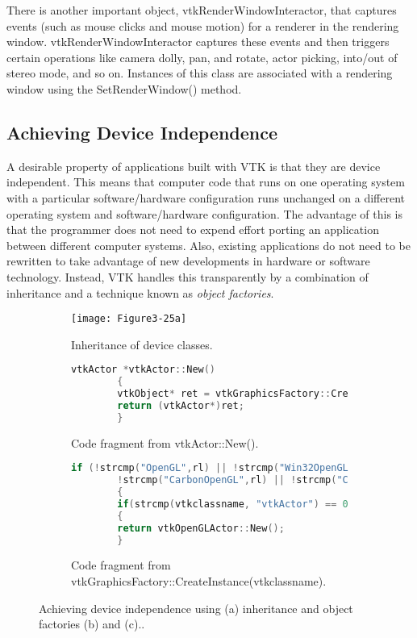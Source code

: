 There is another important object, vtkRenderWindowInteractor, that captures events (such as mouse clicks and mouse motion) for a renderer in the rendering window. vtkRenderWindowInteractor captures these events and then triggers certain operations like camera dolly, pan, and rotate, actor picking, into/out of stereo mode, and so on. Instances of this class are associated with a rendering window using the SetRenderWindow() method.

\subsection{Achieving Device Independence}
\label{sec:adi}
A desirable property of applications built with VTK is that they are device independent. This means that computer code that runs on one operating system with a particular software/hardware configuration runs unchanged on a different operating system and software/hardware configuration. The advantage of this is that the programmer does not need to expend effort porting an application between different computer systems. Also, existing applications do not need to be rewritten to take advantage of new developments in hardware or software technology. Instead, VTK handles this transparently by a combination of inheritance and a technique known as \emph{object factories}.

\begin{figure}[!htb]
	\begin{subfigure}[h]{0.96\linewidth}
		\texttt{[image: Figure3-25a]}
		\caption{Inheritance of device classes.}
		\label{fig:Figure3-25a}
	\end{subfigure}
	\hfill
	\begin{subfigure}[h]{0.96\linewidth}
		\caption*{}
	\end{subfigure}
	\hfill
	\begin{subfigure}[h]{0.96\linewidth}
		\begin{lstlisting}[language=C++, caption={}]
		vtkActor *vtkActor::New()
		{
		vtkObject* ret = vtkGraphicsFactory::CreateInstance("vtkActor");
		return (vtkActor*)ret;
		}
		\end{lstlisting}
		\caption{Code fragment from vtkActor::New().}
		\label{fig:Figure3-25b}
	\end{subfigure}
	\hfill
	\begin{subfigure}[h]{0.96\linewidth}
		\caption*{}
	\end{subfigure}
	\hfill
	\begin{subfigure}[h]{0.96\linewidth}
		\begin{lstlisting}[language=C++, caption={}]
		if (!strcmp("OpenGL",rl) || !strcmp("Win32OpenGL",rl) ||
		!strcmp("CarbonOpenGL",rl) || !strcmp("CocoaOpenGL",rl))
		{
		if(strcmp(vtkclassname, "vtkActor") == 0)
		{
		return vtkOpenGLActor::New();
		}
		\end{lstlisting}
		\caption{Code fragment from vtkGraphicsFactory::CreateInstance(vtkclassname).}
		\label{fig:Figure3-25cc}
	\end{subfigure}
	\caption{Achieving device independence using (a) inheritance and object factories (b) and (c)..}\label{fig:Figure3-25}
\end{figure}

